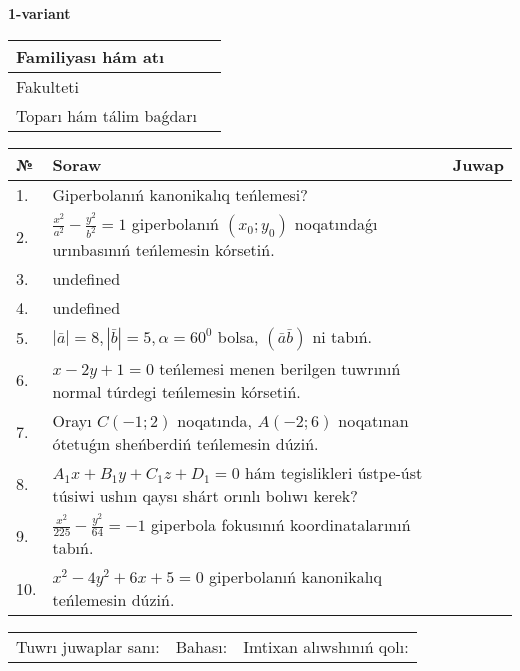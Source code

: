 \documentclass{article}
\begin{document}


\textbf{1-variant}\\

\bgroup
\def\arraystretch{1.6} %

\begin{tabular}{|m{5.7cm}|m{9.5cm}|}
\hline
Familiyası hám atı & \\
\hline
Fakulteti  & \\
\hline
Toparı hám tálim baǵdarı  & \\
\hline
\end{tabular}

\vspace{0.7cm}

\begin{tabular}{|m{0.7cm}|m{10cm}|m{4cm}|}
\hline
№ & Soraw & Juwap \\
\hline
1. & Giperbolanıń kanonikalıq teńlemesi? &  \\
\hline
2. & \(\frac{x^{2}}{a^{2}} - \frac{y^{2}}{b^{2}} = 1\) giperbolanıń \((x_{0};y_{0})\) noqatındaǵı urınbasınıń teńlemesin kórsetiń. &  \\
\hline
3. & undefined &  \\
\hline
4. & undefined &  \\
\hline
5. & \(\left| \bar{a} \right| = 8, \left| \bar{b} \right| = 5, \alpha = 60^{0}\) bolsa, \(( \bar{a}\bar{b} )\) ni tabıń. &  \\
\hline
6. & \(x - 2 y + 1 = 0\) teńlemesi menen berilgen tuwrınıń normal túrdegi teńlemesin kórsetiń. &  \\
\hline
7. & Orayı \(C (- 1;2)\) noqatında, \(A (- 2;6 )\) noqatınan ótetuǵın sheńberdiń teńlemesin dúziń. &  \\
\hline
8. & \(A_{1}x + B_{1}y + C_{1}z + D_{1} = 0\) hám tegislikleri ústpe-úst túsiwi ushın qaysı shárt orınlı bolıwı kerek? &  \\
\hline
9. & \(\frac{x^{2}}{225} - \frac{y^{2}}{64} = - 1\) giperbola fokusınıń koordinatalarınıń tabıń. &  \\
\hline
10. & \(x^{2} - 4 y^{2} + 6 x + 5 = 0\) giperbolanıń kanonikalıq teńlemesin dúziń. & \\
\hline
\end{tabular}

\vspace{0.7cm}

\begin{tabular}{lll}
Tuwrı juwaplar sanı: \underline{\hspace{1cm}} & 
Bahası: \underline{\hspace{1cm}} & 
Imtixan alıwshınıń qolı: \underline{\hspace{2cm}} \\
\end{tabular}
\end{document}
